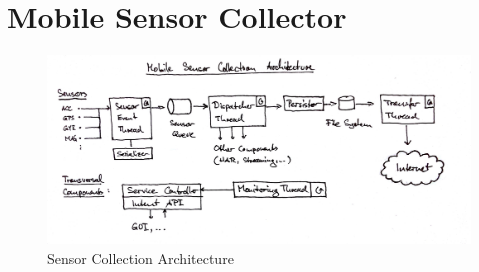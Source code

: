 \label{chap:SensorCollection}



\section{Mobile Sensor Collector}
\label{sec:SensorColllection}

\begin{figure}
\centering
\includegraphics[width=\textwidth]{img/sc/sc_architecture.jpg}
\caption{Sensor Collection Architecture}\label{fig:sc_architecture}
\end{figure}

